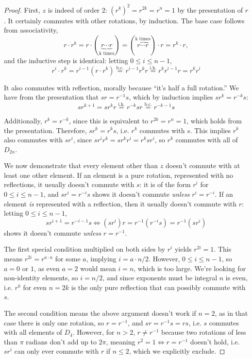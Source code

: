 \documentclass{article}
\begin{document}
\begin{proof}
  First, $z$ is indeed of order 2: $(r^{k})^{2}=r^{2k} = r^{n}=1$ by the presentation of $r$.
  It certainly commutes with other rotations, by induction.
  The base case follows from associativity,
  \[
    r\cdot r^{k} = r\cdot (\underbrace{r\cdots r}_{\textrm{k times}}) = (\overbrace{r\cdots r}^{\textrm{k times}})\cdot r = r^{k}\cdot r,
  \]
  and the inductive step is identical: letting $0\leq i \leq n-1$,
  \[
    r^{i}\cdot r^{k} = r^{i-1}(r\cdot r^{k}) \overset{\text{b.c.}}{=} r^{i-1}r^{k}r \overset{\text{i.h.}}{=} r^{k}r^{i-1}r = r^{k}r^{i}
  \]

  It also commutes with reflection, morally because ``it's half a full rotation.''
  We have from the presentation that $sr=r^{-1}s$, which by induction implies $sr^{k}=r^{-k}s$:
  \[
    sr^{k+1} = sr^{k}r \overset{\text{i.h.}}{=}r^{-k}sr \overset{\text{b.c.}}{=}r^{-k-1}s
  \]

  Additionally, $r^{k}=r^{-k}$, since this is equivalent to $r^{2k}=r^{n}=1$, which holds from the presentation.
  Therefore, $sr^{k}=r^{k}s$, i.e. $r^{k}$ commutes with $s$.
  This implies $r^{k}$ also commutes with $sr^{i}$, since $sr^{i}r^{k}=sr^{k}r^{i} = r^{k}sr^{i}$, so $r^{k}$ commutes with all of $D_{2n}$.

  We now demonstrate that every element other than $z$ doesn't commute with at least one other element.
  If an element is a pure rotation, represented with no reflections, it usually doesn't commute with $s$: it is of the form $r^{i}$ for $0\leq i \leq n-1$,
  and $sr^{i} = r^{-i}s$ shows it doesn't commute \textit{unless} $r^{i}=r^{-i}$.
  If an element \textit{is} represented with a reflection, then it usually doesn't commute with $r$:
  letting $0\leq i \leq n - 1$,
  \[
    sr^{i+1} = r^{-i-1}s \Leftrightarrow (sr^{i})r = r^{-1}(r^{-i}s) = r^{-1}(sr^{i})
  \]
  shows it doesn't commute \textit{unless} $r=r^{-1}$.

  The first special condition multiplied on both sides by $r^{i}$ yields $r^{2i}=1$.
  This means $r^{2i}=r^{a\cdot n}$ for some $a$, implying $i = a\cdot n / 2$.
  However, $0\leq i \leq n-1$, so $a=0$ or $1$, as even $a=2$ would mean $i=n$, which is too large.
  We're looking for non-identity elements, so $i = n / 2$, and since exponents must be integral $n$ is even, i.e. $r^{k}$ for even $n=2k$
  is the only pure reflection that can possibly commute with $s$.

  The second condition means the above argument doesn't work if $n=2$, as in that case there is only one rotation,
  so $r=r^{-1}$, and $sr = r^{-1}s = rs$, i.e. $s$ commutes with all elements of $D_{4}$.
  However, for $n>2$, $r\neq r^{-1}$ because two rotations of less than $\pi$ radians don't add up to $2\pi$,
  meaning $r^{2} = 1 \Leftrightarrow r=r^{-1}$ doesn't hold, i.e. $sr^{i}$ can only ever commute with $r$ if $n\leq 2$,
  which we explicitly exclude.
\end{proof}
\end{document}
